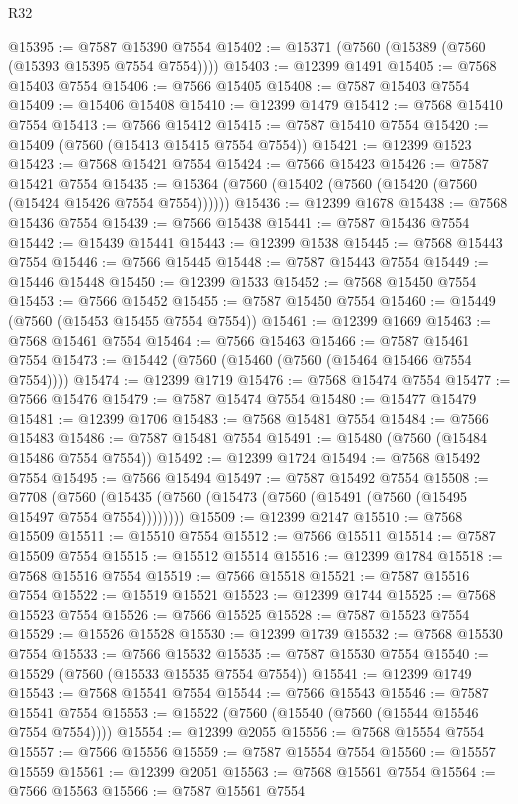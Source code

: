 \begin{lexlean}{R32}
\begin{coremodule}
@15395 := @7587 @15390 @7554
@15402 := @15371 (@7560 (@15389 (@7560 (@15393 @15395 @7554 @7554))))
@15403 := @12399 @1491
@15405 := @7568 @15403 @7554
@15406 := @7566 @15405
@15408 := @7587 @15403 @7554
@15409 := @15406 @15408
@15410 := @12399 @1479
@15412 := @7568 @15410 @7554
@15413 := @7566 @15412
@15415 := @7587 @15410 @7554
@15420 := @15409 (@7560 (@15413 @15415 @7554 @7554))
@15421 := @12399 @1523
@15423 := @7568 @15421 @7554
@15424 := @7566 @15423
@15426 := @7587 @15421 @7554
@15435 := @15364 (@7560 (@15402 (@7560 (@15420 (@7560 (@15424 @15426 @7554 @7554))))))
@15436 := @12399 @1678
@15438 := @7568 @15436 @7554
@15439 := @7566 @15438
@15441 := @7587 @15436 @7554
@15442 := @15439 @15441
@15443 := @12399 @1538
@15445 := @7568 @15443 @7554
@15446 := @7566 @15445
@15448 := @7587 @15443 @7554
@15449 := @15446 @15448
@15450 := @12399 @1533
@15452 := @7568 @15450 @7554
@15453 := @7566 @15452
@15455 := @7587 @15450 @7554
@15460 := @15449 (@7560 (@15453 @15455 @7554 @7554))
@15461 := @12399 @1669
@15463 := @7568 @15461 @7554
@15464 := @7566 @15463
@15466 := @7587 @15461 @7554
@15473 := @15442 (@7560 (@15460 (@7560 (@15464 @15466 @7554 @7554))))
@15474 := @12399 @1719
@15476 := @7568 @15474 @7554
@15477 := @7566 @15476
@15479 := @7587 @15474 @7554
@15480 := @15477 @15479
@15481 := @12399 @1706
@15483 := @7568 @15481 @7554
@15484 := @7566 @15483
@15486 := @7587 @15481 @7554
@15491 := @15480 (@7560 (@15484 @15486 @7554 @7554))
@15492 := @12399 @1724
@15494 := @7568 @15492 @7554
@15495 := @7566 @15494
@15497 := @7587 @15492 @7554
@15508 := @7708
    (@7560 (@15435 (@7560 (@15473 (@7560 (@15491 (@7560 (@15495 @15497 @7554 @7554))))))))
@15509 := @12399 @2147
@15510 := @7568 @15509
@15511 := @15510 @7554
@15512 := @7566 @15511
@15514 := @7587 @15509 @7554
@15515 := @15512 @15514
@15516 := @12399 @1784
@15518 := @7568 @15516 @7554
@15519 := @7566 @15518
@15521 := @7587 @15516 @7554
@15522 := @15519 @15521
@15523 := @12399 @1744
@15525 := @7568 @15523 @7554
@15526 := @7566 @15525
@15528 := @7587 @15523 @7554
@15529 := @15526 @15528
@15530 := @12399 @1739
@15532 := @7568 @15530 @7554
@15533 := @7566 @15532
@15535 := @7587 @15530 @7554
@15540 := @15529 (@7560 (@15533 @15535 @7554 @7554))
@15541 := @12399 @1749
@15543 := @7568 @15541 @7554
@15544 := @7566 @15543
@15546 := @7587 @15541 @7554
@15553 := @15522 (@7560 (@15540 (@7560 (@15544 @15546 @7554 @7554))))
@15554 := @12399 @2055
@15556 := @7568 @15554 @7554
@15557 := @7566 @15556
@15559 := @7587 @15554 @7554
@15560 := @15557 @15559
@15561 := @12399 @2051
@15563 := @7568 @15561 @7554
@15564 := @7566 @15563
@15566 := @7587 @15561 @7554

\end{coremodule}
\end{lexlean}
